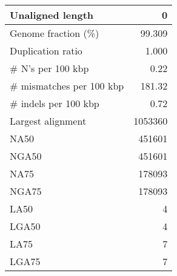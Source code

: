 \documentclass[12pt,a4paper]{article}
\begin{document}
\begin{table}[ht]
\begin{center}
\begin{tabular}{|l*{1}{|r}|}
Unaligned length & 0 \\ \hline
Genome fraction (\%) & 99.309 \\ \hline
Duplication ratio & 1.000 \\ \hline
\# N's per 100 kbp & 0.22 \\ \hline
\# mismatches per 100 kbp & 181.32 \\ \hline
\# indels per 100 kbp & 0.72 \\ \hline
Largest alignment & 1053360 \\ \hline
NA50 & 451601 \\ \hline
NGA50 & 451601 \\ \hline
NA75 & 178093 \\ \hline
NGA75 & 178093 \\ \hline
LA50 & 4 \\ \hline
LGA50 & 4 \\ \hline
LA75 & 7 \\ \hline
LGA75 & 7 \\ \hline
\end{tabular}
\end{center}
\end{table}
\end{document}
